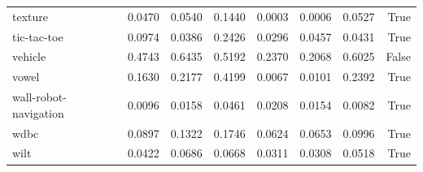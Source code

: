 \begin{table}[htbp]
\begin{tabular}{lrrrrrrr}
texture & 0.0470 & 0.0540 & 0.1440 & 0.0003 & 0.0006 & 0.0527 & True \\
tic-tac-toe & 0.0974 & 0.0386 & 0.2426 & 0.0296 & 0.0457 & 0.0431 & True \\
vehicle & 0.4743 & 0.6435 & 0.5192 & 0.2370 & 0.2068 & 0.6025 & False \\
vowel & 0.1630 & 0.2177 & 0.4199 & 0.0067 & 0.0101 & 0.2392 & True \\
wall-robot-navigation & 0.0096 & 0.0158 & 0.0461 & 0.0208 & 0.0154 & 0.0082 & True \\
wdbc & 0.0897 & 0.1322 & 0.1746 & 0.0624 & 0.0653 & 0.0996 & True \\
wilt & 0.0422 & 0.0686 & 0.0668 & 0.0311 & 0.0308 & 0.0518 & True \\
\hline
\end{tabular}
\end{table}
